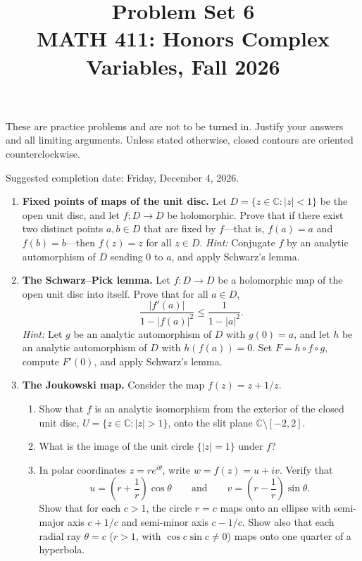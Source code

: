 \documentclass[12pt,reqno]{amsart}
\title{Problem Set 6 \\ MATH 411: Honors Complex Variables, Fall 2026}
\newcommand{\C}{\mathbb{C}}
\begin{document}
\maketitle

These are practice problems and are not to be turned in. Justify your
answers and all limiting arguments. Unless stated otherwise, closed
contours are oriented counterclockwise.

Suggested completion date: Friday, December 4, 2026.

\begin{enumerate}

\item \textbf{Fixed points of maps of the unit disc.}
Let $D=\{z\in\C:|z|<1\}$ be the open unit disc, and let $f:D\to D$ be
holomorphic. Prove that if there exist two distinct points $a,b\in D$
that are fixed by $f$---that is, $f(a)=a$ and $f(b)=b$---then $f(z)=z$
for all $z\in D$.
\emph{Hint:} Conjugate $f$ by an analytic automorphism of $D$ sending
$0$ to $a$, and apply Schwarz's lemma.


\item \textbf{The Schwarz--Pick lemma.}
Let $f:D\to D$ be a holomorphic map of the open unit disc into itself.
Prove that for all $a\in D$,
\[
 \frac{|f'(a)|}{1-|f(a)|^2}\leq\frac{1}{1-|a|^2}.
\]
\emph{Hint:} Let $g$ be an analytic automorphism of $D$ with $g(0)=a$,
and let $h$ be an analytic automorphism of $D$ with $h(f(a))=0$. Set
$F=h\circ f\circ g$, compute $F'(0)$, and apply Schwarz's lemma.


\item \textbf{The Joukowski map.}
Consider the map $f(z)=z+1/z$.
\begin{enumerate}
\item Show that $f$ is an analytic isomorphism from the exterior of the
closed unit disc, $U=\{z\in\C:|z|>1\}$, onto the slit plane
$\C\setminus[-2,2]$.
\item What is the image of the unit circle $\{|z|=1\}$ under $f$?
\item In polar coordinates $z=re^{i\theta}$, write $w=f(z)=u+iv$.
Verify that
\[
 u=\left(r+\frac{1}{r}\right)\cos\theta
 \qquad\text{and}\qquad
 v=\left(r-\frac{1}{r}\right)\sin\theta.
\]
Show that for each $c>1$, the circle $r=c$ maps onto an ellipse with
semi-major axis $c+1/c$ and semi-minor axis $c-1/c$. Show also that
each radial ray $\theta=c$ ($r>1$, with $\cos c\sin c\neq0$) maps onto
one quarter of a hyperbola.
\end{enumerate}




\end{enumerate}
\end{document}
